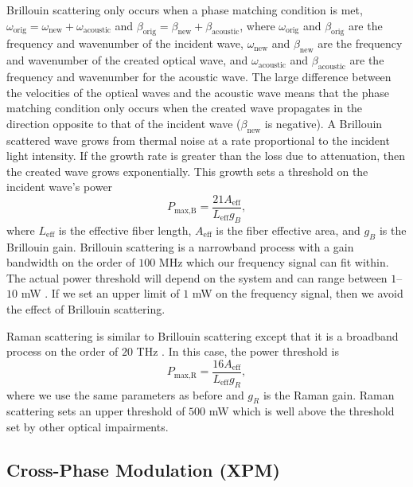 Brillouin scattering only occurs when a phase matching condition is met, $\omega_{\text{orig}} = \omega_{\text{new}} + \omega_{\text{acoustic}}$ and $\beta_{\text{orig}} = \beta_{\text{new}} + \beta_{\text{acoustic}}$, where $\omega_{\text{orig}}$ and $\beta_{\text{orig}}$ are the frequency and wavenumber of the incident wave, $\omega_{\text{new}}$ and $\beta_{\text{new}}$ are the frequency and wavenumber of the created optical wave, and $\omega_{\text{acoustic}}$ and $\beta_{\text{acoustic}}$ are the frequency and wavenumber for the acoustic wave. The large difference between the velocities of the optical waves and the acoustic wave means that the phase matching condition only occurs when the created wave propagates in the direction opposite to that of the incident wave ($\beta_{\text{new}}$ is negative). A Brillouin scattered wave grows from thermal noise at a rate proportional to the incident light intensity. If the growth rate is greater than the loss due to attenuation, then the created wave grows exponentially. This growth sets a threshold on the incident wave's power \cite{Boyd2003, agrawal2012fiber}
%
\begin{equation}
P_{\text{max,B}} = \frac{21A_{\text{eff}}}{L_{\text{eff}}g_B},
\end{equation}
%
where $L_{\text{eff}}$ is the effective fiber length, $A_{\text{eff}}$ is the fiber effective area, and $g_B$ is the Brillouin gain. Brillouin scattering is a narrowband process with a gain bandwidth on the order of $100$ MHz which our frequency signal can fit within. The actual power threshold will depend on the system and can range between $1$--$10$ mW \cite{agrawal2012fiber}. If we set an upper limit of $1$ mW on the frequency signal, then we avoid the effect of Brillouin scattering.

Raman scattering is similar to Brillouin scattering except that it is a broadband process on the order of $20$ THz \cite{Boyd2003}. In this case, the power threshold is \cite{agrawal2012fiber}
%
\begin{equation}
P_{\text{max,R}} = \frac{16A_{\text{eff}}}{L_{\text{eff}}g_R},
\end{equation}
%
where we use the same parameters as before and $g_R$ is the Raman gain. Raman scattering sets an upper threshold of $500$ mW which is well above the threshold set by other optical impairments.


\subsection{Cross-Phase Modulation (XPM)}

